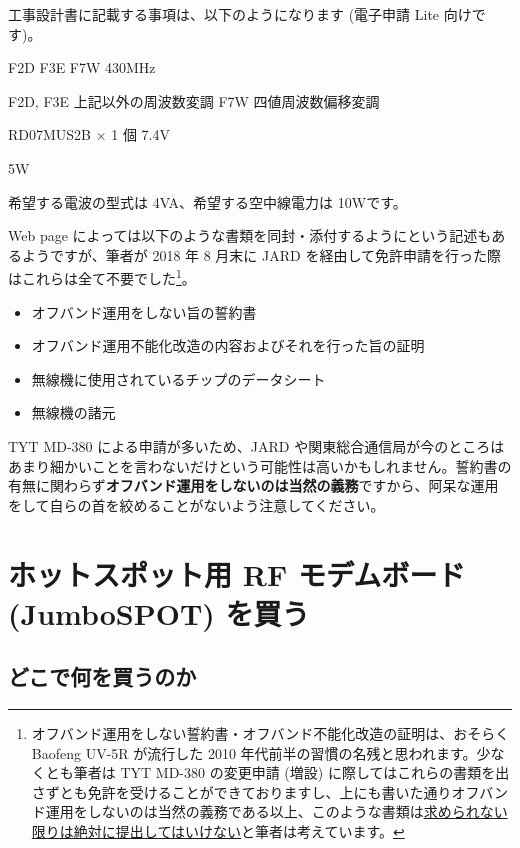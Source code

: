 \documentclass[a4j,oneside]{ujbook}
\begin{document}
工事設計書に記載する事項は、以下のようになります (電子申請 Lite 向けです)。
\begin{description}[style=nextline]
 \item[発射可能な電波の形式及び周波数の範囲] F2D F3E F7W 430MHz 
 \item[変調方式] F2D, F3E 上記以外の周波数変調 \newline
   F7W 四値周波数偏移変調 
 \item[終段管 (名称×個数・電圧)] RD07MUS2B × 1 個 7.4V 
 \item[定格出力] 5W
\end{description}
希望する電波の型式は 4VA、希望する空中線電力は 10Wです。

Web page によっては以下のような書類を同封・添付するようにという記述もあるようですが、筆者が 2018 年 8 月末に JARD を経由して免許申請を行った際はこれらは全て不要でした\footnote{オフバンド運用をしない誓約書・オフバンド不能化改造の証明は、おそらく Baofeng UV-5R が流行した 2010 年代前半の習慣の名残と思われます。少なくとも筆者は TYT MD-380 の変更申請 (増設) に際してはこれらの書類を出さずとも免許を受けることができておりますし、上にも書いた通りオフバンド運用をしないのは当然の義務である以上、このような書類は\underline{求められない限りは絶対に提出してはいけない}と筆者は考えています。}。
\begin{itemize}[style=nextline]
 \item オフバンド運用をしない旨の誓約書
 \item オフバンド運用不能化改造の内容およびそれを行った旨の証明
 \item 無線機に使用されているチップのデータシート
 \item 無線機の諸元
\end{itemize}
TYT MD-380 による申請が多いため、JARD や関東総合通信局が今のところはあまり細かいことを言わないだけという可能性は高いかもしれません。誓約書の有無に関わらず\textbf{オフバンド運用をしないのは当然の義務}ですから、阿呆な運用をして自らの首を絞めることがないよう注意してください。

\chapter{ホットスポット用 RF モデムボード (JumboSPOT) を買う}
\section{どこで何を買うのか}
\end{document}
